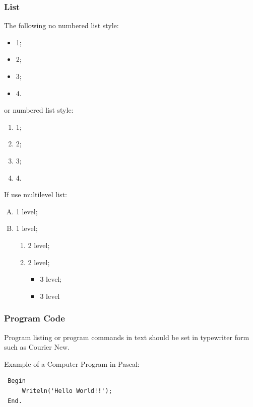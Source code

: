 \documentclass[a4paper,twoside]{article}
\begin{document}
\subsubsection{List}\label{subsubsec:list}

\noindent The following no numbered  list style:

\begin{itemize}
    \item 1;
    \item 2;
    \item 3;
    \item 4.
\end{itemize}

or numbered list style:

\begin{enumerate}
    \item 1;
    \item 2;
    \item 3;
    \item 4.
\end{enumerate}

If use multilevel list:

\begin{enumerate}[A)]
    \item 1 level;
    \item 1 level;
        \begin{enumerate}[1)]
            \item 2 level;
            \item 2 level;
            \begin{itemize}
                \item 3 level;
                \item 3 level
            \end{itemize}
        \end{enumerate}
\end{enumerate}

\subsubsection{Program Code}\label{subsubsec:program_code}

\noindent Program listing or program commands in text should be set in
typewriter form such as Courier New.

Example of a Computer Program in Pascal:

\begin{small}
\begin{verbatim}
 Begin
     Writeln('Hello World!!');
 End.
\end{verbatim}
\end{small}
\end{document}
